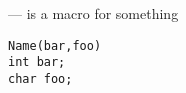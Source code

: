 \startmanpage
{}
--- is a macro for something 
\startvb\begin{verbatim}
Name(bar,foo)
int bar;
char foo;

\end{verbatim}
\endvb

\endmanpage
